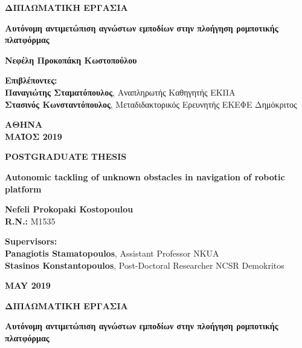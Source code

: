 \begin{titlepage}
\begin{center}
		\vspace{1.5cm}
		\textbf{ΔΙΠΛΩΜΑΤΙΚΗ ΕΡΓΑΣΙΑ}
		
		\vspace{1.5cm}
		\Large
		\textbf{Αυτόνομη αντιμετώπιση αγνώστων εμποδίων στην πλοήγηση ρομποτικής πλατφόρμας}
		
		\vspace{1.5cm}
		\normalsize
		\textbf{Νεφέλη Προκοπάκη Κωστοπούλου}
		
		\vspace{1.5cm}
		\textbf{Επιβλέποντες:}\\
		\textbf{Παναγιώτης Σταματόπουλος}, Αναπληρωτής Καθηγητής ΕΚΠΑ\\
		\textbf{Στασινός Κωνσταντόπουλος}, Μεταδιδακτορικός Ερευνητής ΕΚΕΦΕ Δημόκριτος
		
		\vfill
		
		\vspace{0.8cm}
		\textbf{ΑΘΗΝΑ}\\
		\textbf{ΜΑΪΟΣ 2019}
		\thispagestyle{empty}
		\newpage
		
		
		\normalsize
		
		\vspace{1.5cm}
		\textbf{POSTGRADUATE THESIS}
		
		\vspace{1.5cm}
		\textbf{Autonomic tackling of unknown obstacles in navigation of robotic platform}
		
		\vspace{1.5cm}
		\textbf{Nefeli Prokopaki Kostopoulou}\\
		\textbf{R.N.: } M1535
				
		\vspace{1.5cm}
		\textbf{Supervisors:}\\
		\textbf{Panagiotis Stamatopoulos}, Assistant Professor NKUA\\
		\textbf{Stasinos Konstantopoulos}, Post-Doctoral Researcher NCSR Demokritos
		
		\vfill
		
		\vspace{0.8cm}
		\textbf{MAY 2019}
		\thispagestyle{empty}
		\newpage
		
		
		
		\vspace{1.5cm}
		\textbf{ΔΙΠΛΩΜΑΤΙΚΗ ΕΡΓΑΣΙΑ}
		
		\vspace{1.5cm}
		\textbf{Αυτόνομη αντιμετώπιση αγνώστων εμποδίων στην πλοήγηση ρομποτικής πλατφόρμας}
		

\end{center}
\end{titlepage}
